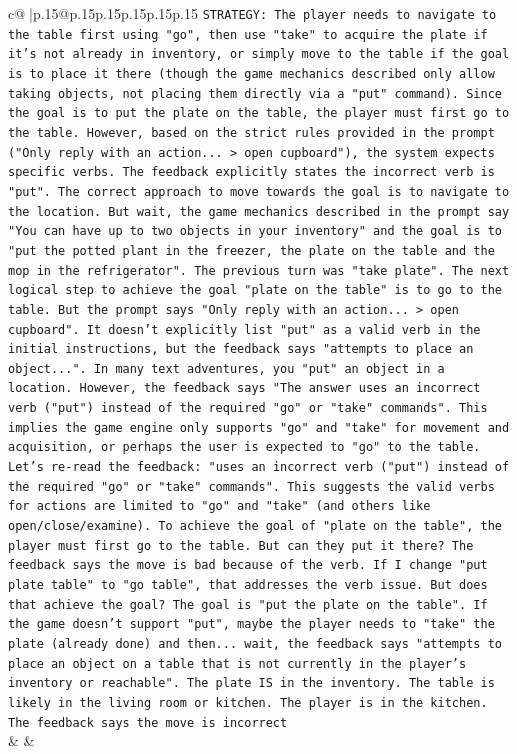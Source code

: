 \documentclass{article}
\begin{document}
{\begin{supertabular}{c@{$\;$}|p{.15\linewidth}@{}p{.15\linewidth}p{.15\linewidth}p{.15\linewidth}p{.15\linewidth}p{.15\linewidth}}
{{{\texttt{STRATEGY: The player needs to navigate to the table first using "go", then use "take" to acquire the plate if it's not already in inventory, or simply move to the table if the goal is to place it there (though the game mechanics described only allow taking objects, not placing them directly via a "put" command). Since the goal is to put the plate on the table, the player must first go to the table. However, based on the strict rules provided in the prompt ("Only reply with an action... > open cupboard"), the system expects specific verbs. The feedback explicitly states the incorrect verb is "put". The correct approach to move towards the goal is to navigate to the location. But wait, the game mechanics described in the prompt say "You can have up to two objects in your inventory" and the goal is to "put the potted plant in the freezer, the plate on the table and the mop in the refrigerator". The previous turn was "take plate". The next logical step to achieve the goal "plate on the table" is to go to the table. But the prompt says "Only reply with an action... > open cupboard". It doesn't explicitly list "put" as a valid verb in the initial instructions, but the feedback says "attempts to place an object...". In many text adventures, you "put" an object in a location. However, the feedback says "The answer uses an incorrect verb ("put") instead of the required "go" or "take" commands". This implies the game engine only supports "go" and "take" for movement and acquisition, or perhaps the user is expected to "go" to the table. Let's re{-}read the feedback: "uses an incorrect verb ("put") instead of the required "go" or "take" commands". This suggests the valid verbs for actions are limited to "go" and "take" (and others like open/close/examine). To achieve the goal of "plate on the table", the player must first go to the table. But can they put it there? The feedback says the move is bad because of the verb. If I change "put plate table" to "go table", that addresses the verb issue. But does that achieve the goal? The goal is "put the plate on the table". If the game doesn't support "put", maybe the player needs to "take" the plate (already done) and then... wait, the feedback says "attempts to place an object on a table that is not currently in the player's inventory or reachable". The plate IS in the inventory. The table is likely in the living room or kitchen. The player is in the kitchen. The feedback says the move is incorrect} \\
            }
        }
    }
    & & \\ \\


\end{supertabular}}
\end{document}
